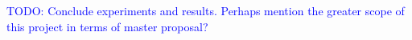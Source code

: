 \textcolor{blue}{TODO: Conclude experiments and results. Perhaps mention the greater scope of this project in terms of master proposal?}